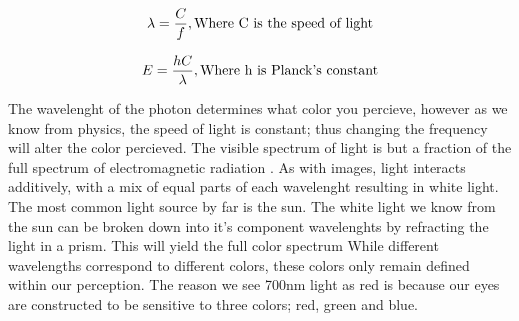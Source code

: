 \begin{align}
\centering 
\lambda = \frac{C}{f}, \text{Where C is the speed of light}
\label{eq:wavelenght} 
\end{align}

\begin{align}
\centering
E = \frac{hC}{\lambda}, \text{Where h is Planck's constant}
\label{eq:e_v} 
\end{align}

The wavelenght of the photon determines what color you percieve, however as we know from physics, the speed of light is constant; thus changing the frequency will alter the color percieved. The visible spectrum of light is but a fraction of the full spectrum of electromagnetic radiation . As with images, light interacts additively, with a mix of equal parts of each wavelenght resulting in white light.
The most common light source by far is the sun. The white light we know from the sun can be broken down into it's component wavelenghts by refracting the light in a prism. This will yield the full color spectrum
While different wavelengths correspond to different colors, these colors only remain defined within our perception. The reason we see 700nm light as red is because our eyes are constructed to be sensitive to three colors; red, green and blue. 
 


